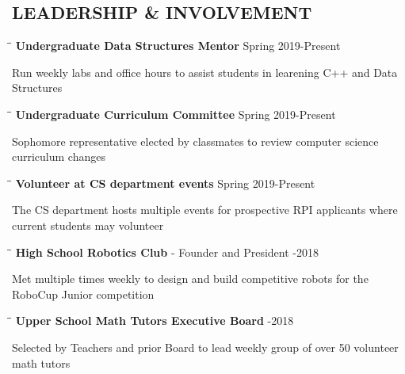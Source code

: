 \documentclass{res}
\begin{document}
\begin{resume}
\section{LEADERSHIP \& INVOLVEMENT} 
	\vspace{-0.1in}	         
	\begin{tabbing}
   \hspace{2.3in}\= \hspace{3.4in}\= \kill
    {\bf Undergraduate Data Structures Mentor} \>  \>Spring 2019-Present
   \end{tabbing}\vspace{-20pt} 
	Run weekly labs and office hours to assist students in learening C++ and Data Structures
    \vspace{-15pt} 
    \begin{tabbing}
   \hspace{2.3in}\= \hspace{3.4in}\= \kill
    {\bf Undergraduate Curriculum Committee} \>  \>Spring 2019-Present
   \end{tabbing}\vspace{-20pt} 
	Sophomore representative elected by classmates to review computer science curriculum changes
	\vspace{-15pt} 
    \begin{tabbing}
   \hspace{2.3in}\= \hspace{3.4in}\= \kill
    {\bf Volunteer at CS department events} \>  \>Spring 2019-Present
   \end{tabbing}\vspace{-20pt} 
	 The CS department hosts multiple events for prospective RPI applicants where current students may volunteer
	 \vspace{-15pt} 
    \begin{tabbing}
   \hspace{2.3in}\= \hspace{4in}\= \kill
    {\bf High School Robotics Club} - Founder and President \>  -2018
   \end{tabbing}\vspace{-20pt} 
	 Met multiple times weekly to design and build competitive robots for the RoboCup Junior competition
    \vspace{-15pt} 
    \begin{tabbing}
   \hspace{2.3in}\= \hspace{4in}\= \kill
    {\bf Upper School Math Tutors Executive Board} \>  -2018
   \end{tabbing}\vspace{-20pt} 
	 Selected by Teachers and prior Board to lead weekly group of over 50 volunteer math tutors
    



\end{resume}
\end{document}
